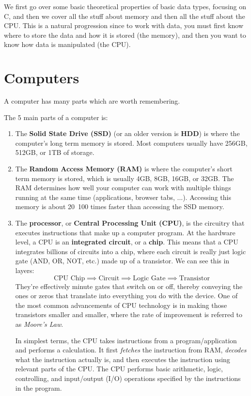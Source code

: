 \documentclass{article}
\begin{document}
We first go over some basic theoretical properties of basic data types, focusing on C, and then we cover all the stuff about memory and then all the stuff about the CPU. This is a natural progression since to work with data, you must first know where to store the data and how it is stored (the memory), and then you want to know how data is manipulated (the CPU). 

\section{Computers}

  A computer has many parts which are worth remembering. 

  \begin{definition}
  The 5 main parts of a computer is: 
  \begin{enumerate}
      \item The \textbf{Solid State Drive (SSD)} (or an older version is \textbf{HDD}) is where the computer's long term memory is stored. Most computers usually have 256GB, 512GB, or 1TB of storage. 
      
      \item The \textbf{Random Access Memory (RAM)} is where the computer's short term memory is stored, which is usually 4GB, 8GB, 16GB, or 32GB. The RAM determines how well your computer can work with multiple things running at the same time (applications, browser tabs, ...). Accessing this memory is about 20~100 times faster than accessing the SSD memory. 
      
      \item The \textbf{processor}, or \textbf{Central Processing Unit (CPU)}, is the circuitry that executes instructions that make up a computer program. At the hardware level, a CPU is an \textbf{integrated circuit}, or a \textbf{chip}. This means that a CPU integrates billions of circuits into a chip, where each circuit is really just logic gate (AND, OR, NOT, etc.) made up of a transistor. We can see this in layers: 
      \[\text{CPU Chip} \implies \text{Circuit} \implies \text{Logic Gate} \implies \text{Transistor}\]
      They’re effectively minute gates that switch on or off, thereby conveying the ones or zeros that translate into everything you do with the device. One of the most common advancements of CPU technology is in making those transistors smaller and smaller, where the rate of improvement is referred to as \textit{Moore's Law}. 
      
      In simplest terms, the CPU takes instructions from a program/application and performs a calculation. It first \textit{fetches} the instruction from RAM, \textit{decodes} what the instruction actually is, and then executes the instruction using relevant parts of the CPU. The CPU performs basic arithmetic, logic, controlling, and input/output (I/O) operations specified by the instructions in the program. 
      

\end{enumerate}
\end{definition}
\end{document}

